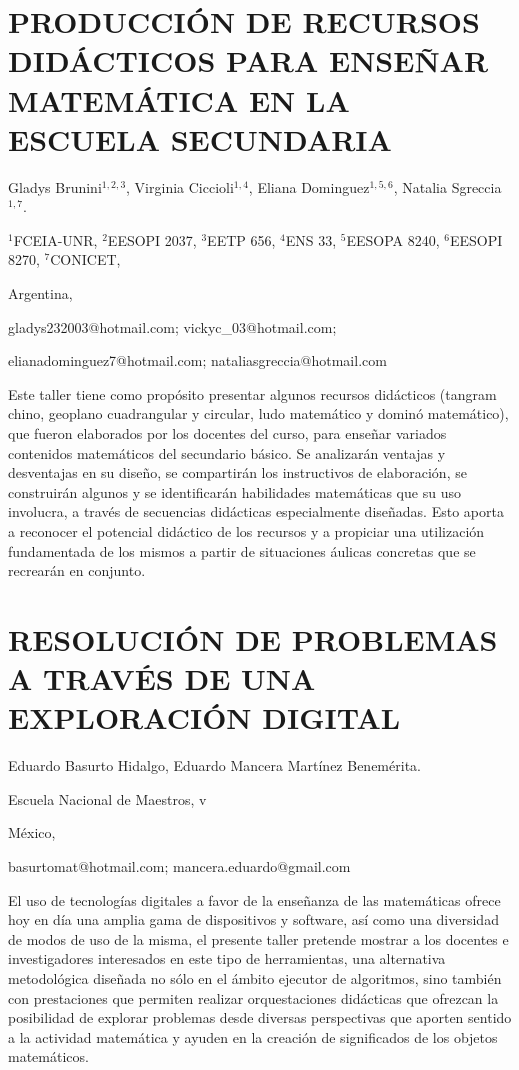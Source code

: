 \section{PRODUCCIÓN DE RECURSOS DIDÁCTICOS PARA ENSEÑAR MATEMÁTICA EN LA ESCUELA
SECUNDARIA}

\begin{datos}

Gladys Brunini$^{1,2,3}$, Virginia Ciccioli$^{1,4}$, Eliana Dominguez$^{1,5,6}$,
Natalia Sgreccia$^{1,7}$.

$^{1}$FCEIA-UNR, $^{2}$EESOPI 2037, $^{3}$EETP 656, $^{4}$ENS
33, $^{5}$EESOPA 8240, $^{6}$EESOPI 8270, $^{7}$CONICET,

Argentina,

gladys232003@hotmail.com; vickyc\_03@hotmail.com;

elianadominguez7@hotmail.com; nataliasgreccia@hotmail.com

\end{datos}

Este taller tiene como propósito presentar algunos recursos didácticos
(tangram chino, geoplano cuadrangular y circular, ludo matemático
y dominó matemático), que fueron elaborados por los docentes del curso,
para enseñar variados contenidos matemáticos del secundario básico.
Se analizarán ventajas y desventajas en su diseño, se compartirán
los instructivos de elaboración, se construirán algunos y se identificarán
habilidades matemáticas que su uso involucra, a través de secuencias
didácticas especialmente diseñadas. Esto aporta a reconocer el potencial
didáctico de los recursos y a propiciar una utilización fundamentada
de los mismos a partir de situaciones áulicas concretas que se recrearán
en conjunto. 


\section{RESOLUCIÓN DE PROBLEMAS A TRAVÉS DE UNA EXPLORACIÓN DIGITAL}

\begin{datos}

Eduardo Basurto Hidalgo, Eduardo Mancera Martínez Benemérita.

Escuela Nacional de Maestros, v

México,

basurtomat@hotmail.com; mancera.eduardo@gmail.com

\end{datos}

El uso de tecnologías digitales a favor de la enseñanza de las matemáticas
ofrece hoy en día una amplia gama de dispositivos y software, así
como una diversidad de modos de uso de la misma, el presente taller
pretende mostrar a los docentes e investigadores interesados en este
tipo de herramientas, una alternativa metodológica diseñada no sólo
en el ámbito ejecutor de algoritmos, sino también con prestaciones
que permiten realizar orquestaciones didácticas que ofrezcan la posibilidad
de explorar problemas desde diversas perspectivas que aporten sentido
a la actividad matemática y ayuden en la creación de significados
de los objetos matemáticos.


